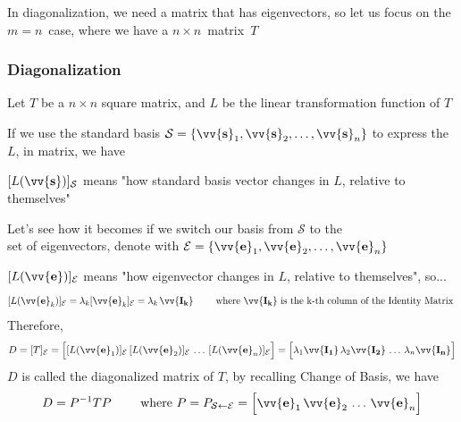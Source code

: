 \documentclass[11pt]{article}
\DeclareRobustCommand{\myvec}[1]{\vv{\mathbf{#1}}}
\newcommand{\myset}[1]{\mathcal{#1}}
\newcommand{\mymat}[1]{#1}
\begin{document}
    In diagonalization, we need a matrix that has eigenvectors, so let us focus on the $m = n$~case, where we have a $n \times n$~matrix~$\mymat{T}$

    \begin{minipage}{\textwidth}
        \subsubsection{Diagonalization}
        Let $\mymat{T}$ be a $n \times n$ square matrix, and $\mymat{L}$ be the linear transformation function of $T$ 
        \vspace{2ex}

        If we use the standard basis $\myset{S} = \{ \myvec{s}_1, \myvec{s}_2, \dots, \myvec{s}_n \}$ to express the $\mymat{L}$, in matrix, we have 
        \vspace{1ex}
    
        $[\mymat{L}(\myvec{s})]_\myset{S}$ means "how standard basis vector changes in $\mymat{L}$, relative to themselves"
        \vspace{2ex}
        
        Let's see how it becomes if we switch our basis from $\myset{S}$ to the \\
        set of eigenvectors, denote with $\myset{E} = \{ \myvec{e}_1, \myvec{e}_2, \dots, \myvec{e}_n \}$ 
        \vspace{1ex}
    
        $[\mymat{L}(\myvec{e})]_\myset{E}$ means "how eigenvector changes in $\mymat{L}$, relative to themselves", so...
        \[ [\mymat{L}(\myvec{e}_k)]_\myset{E} = \lambda_k [\myvec{e}_k]_{\myset{E}} = \lambda_k\,\myvec{\mymat{I}_k} \qquad \text{ where $\myvec{\mymat{I}_k}$ is the k-th column of the Identity Matrix }\]
        Therefore, 
        \begin{equation*}
            \mymat{D} = [\mymat{T}]_{\myset{E}} = \Big[ [\mymat{L}(\myvec{e}_1)]_\myset{E}\,[\mymat{L}(\myvec{e}_2)]_\myset{E}\,\dots\,[\mymat{L}(\myvec{e}_n)]_\myset{E} \Big] = \Big[ \lambda_1\myvec{\mymat{I}_1}\,\lambda_2\myvec{\mymat{I}_2}\,\dots\,\lambda_n\myvec{\mymat{I}_n} \Big]
        \end{equation*}
        $\mymat{D}$ is called the diagonalized matrix of $\mymat{T}$, by recalling Change of Basis, we have
        \begin{equation}
            \mymat{D} = \mymat{P}^{-1} \mymat{T} \mymat{P} \qquad \text{ where }\mymat{P} = \mymat{P}_{\myset{S}\leftarrow\myset{E}} = \Big[ \myvec{e}_1\,\myvec{e}_2\,\dots\,\myvec{e}_n \Big]
        \end{equation}
    \end{minipage}
    
\end{document}

